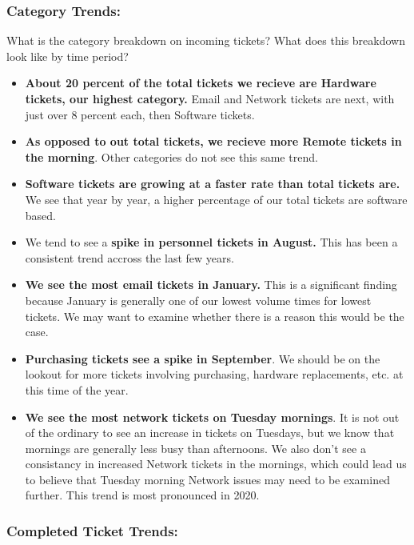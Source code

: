 \documentclass[11pt]{article}
\begin{document}
\hypertarget{category-trends}{%
\subsubsection{Category Trends:}\label{category-trends}}

What is the category breakdown on incoming tickets? What does this
breakdown look like by time period?

\begin{itemize}
\item
  \textbf{About 20 percent of the total tickets we recieve are Hardware
  tickets, our highest category.} Email and Network tickets are next,
  with just over 8 percent each, then Software tickets. 
\item
  \textbf{As opposed to out total tickets, we recieve more Remote
  tickets in the morning}. Other categories do not see this same trend. 
\item
  \textbf{Software tickets are growing at a faster rate than total
  tickets are.} We see that year by year, a higher percentage of our
  total tickets are software based. 
\item
  We tend to see a \textbf{spike in personnel tickets in August.} This
  has been a consistent trend accross the last few years. 
\item
  \textbf{We see the most email tickets in January.} This is a
  significant finding because January is generally one of our lowest
  volume times for lowest tickets. We may want to examine whether there
  is a reason this would be the case. 
\item
  \textbf{Purchasing tickets see a spike in September}. We should be on
  the lookout for more tickets involving purchasing, hardware
  replacements, etc. at this time of the year. 
\item
  \textbf{We see the most network tickets on Tuesday mornings}. It is
  not out of the ordinary to see an increase in tickets on Tuesdays, but
  we know that mornings are generally less busy than afternoons. We also
  don't see a consistancy in increased Network tickets in the mornings,
  which could lead us to believe that Tuesday morning Network issues may
  need to be examined further. This trend is most pronounced in 2020.
\end{itemize}

\hypertarget{completed-ticket-trends}{%
\subsubsection{Completed Ticket Trends:}\label{completed-ticket-trends}}
\end{document}
